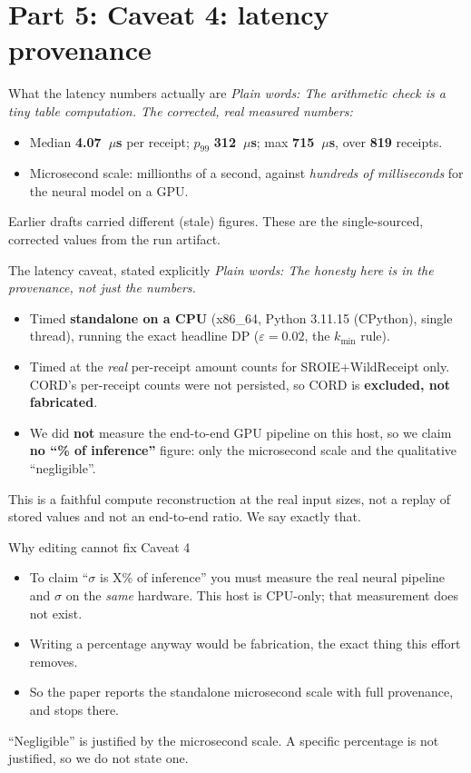 \documentclass[aspectratio=169]{beamer}
\newcommand{\latMedian}{4.07}
\newcommand{\latPNineNine}{312}
\newcommand{\latMax}{715}
\newcommand{\latN}{819}
\newcommand{\latUnit}{\ensuremath{\mu}s}
\newcommand{\latHardware}{x86\_64, Python 3.11.15 (CPython), single thread}
\newcommand{\keybox}[1]{\begin{center}\colorbox{grey!15}{\parbox{0.92\linewidth}{\centering #1}}\end{center}}
\newcommand{\plain}[1]{\textit{\textcolor{sig}{Plain words:} #1}}
\begin{document}
\section{Part 5: Caveat 4: latency provenance}
\begin{frame}{What the latency numbers actually are}
\plain{The arithmetic check is a tiny table computation. The corrected,
real measured numbers:}
\begin{itemize}
\item Median \textbf{\latMedian~\latUnit{}} per receipt; $p_{99}$
\textbf{\latPNineNine~\latUnit{}}; max \textbf{\latMax~\latUnit{}}, over
\textbf{\latN{}} receipts.
\item Microsecond scale: millionths of a second, against \emph{hundreds
of milliseconds} for the neural model on a GPU.
\end{itemize}
\keybox{Earlier drafts carried different (stale) figures. These are the
single-sourced, corrected values from the run artifact.}
\end{frame}

\begin{frame}{The latency caveat, stated explicitly}
\plain{The honesty here is in the \emph{provenance}, not just the
numbers.}
\begin{itemize}
\item Timed \textbf{standalone on a CPU} (\latHardware), running the
exact headline DP ($\varepsilon{=}0.02$, the $k_{\min}$ rule).
\item Timed at the \emph{real} per-receipt amount counts for
SROIE${+}$WildReceipt only. CORD's per-receipt counts were not
persisted, so CORD is \textbf{excluded, not fabricated}.
\item We did \textbf{not} measure the end-to-end GPU pipeline on this
host, so we claim \textbf{no ``\% of inference''} figure: only the
microsecond scale and the qualitative ``negligible''.
\end{itemize}
\keybox{This is a faithful compute reconstruction at the real input
sizes, not a replay of stored values and not an end-to-end ratio. We
say exactly that.}
\end{frame}

\begin{frame}{Why editing cannot fix Caveat 4}
\begin{itemize}
\item To claim ``$\sigma$ is X\% of inference'' you must measure the
real neural pipeline and $\sigma$ on the \emph{same} hardware. This host
is CPU-only; that measurement does not exist.
\item Writing a percentage anyway would be fabrication, the exact thing
this effort removes.
\item So the paper reports the standalone microsecond scale with full
provenance, and stops there.
\end{itemize}
\keybox{``Negligible'' is justified by the microsecond scale. A specific
percentage is not justified, so we do not state one.}
\end{frame}
\end{document}
